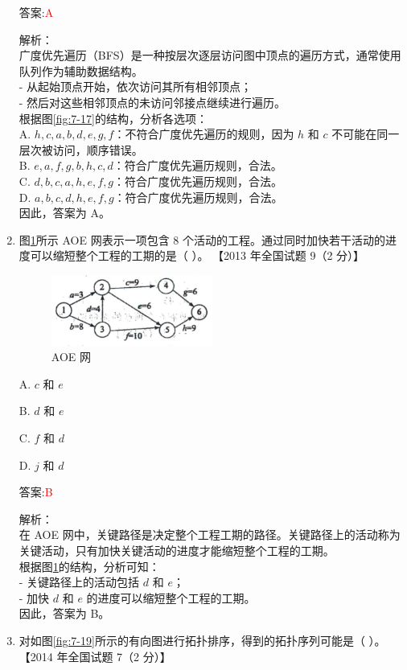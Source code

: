 \documentclass[lang=cn,newtx,10pt,scheme=chinese]{../../../elegantbook}
\begin{document}
\begin{enumerate}
        答案:\textcolor{red}{A}

        解析：\\
        广度优先遍历（BFS）是一种按层次逐层访问图中顶点的遍历方式，通常使用队列作为辅助数据结构。\\
        - 从起始顶点开始，依次访问其所有相邻顶点；\\
        - 然后对这些相邻顶点的未访问邻接点继续进行遍历。\\
        根据图\ref{fig:7-17}的结构，分析各选项：\\
        A. $h, c, a, b, d, e, g, f$：不符合广度优先遍历的规则，因为 $h$ 和 $c$ 不可能在同一层次被访问，顺序错误。\\
        B. $e, a, f, g, b, h, c, d$：符合广度优先遍历规则，合法。\\
        C. $d, b, c, a, h, e, f, g$：符合广度优先遍历规则，合法。\\
        D. $a, b, c, d, h, e, f, g$：符合广度优先遍历规则，合法。\\
        因此，答案为 A。
        \item 图\ref{fig:7-18}所示 AOE 网表示一项包含 8 个活动的工程。通过同时加快若干活动的进度可以缩短整个工程的工期的是（ ）。  
        【2013 年全国试题 9（2 分）】  

        \begin{figure}[h!]
            \centering
            \includegraphics[width=0.5\textwidth]{../../figure/exercisePicPDF/chapter7/7-18.pdf}
            \caption{AOE 网}
            \label{fig:7-18}
    \end{figure}

        A. $c$ 和 $e$  

        B. $d$ 和 $e$  

        C. $f$ 和 $d$  

        D. $j$ 和 $d$  
    
        答案:\textcolor{red}{B}

        解析：\\
        在 AOE 网中，关键路径是决定整个工程工期的路径。关键路径上的活动称为关键活动，只有加快关键活动的进度才能缩短整个工程的工期。\\
        根据图\ref{fig:7-18}的结构，分析可知：\\
        - 关键路径上的活动包括 $d$ 和 $e$；\\
        - 加快 $d$ 和 $e$ 的进度可以缩短整个工程的工期。\\
        因此，答案为 B。
        \item 对如图\ref{fig:7-19}所示的有向图进行拓扑排序，得到的拓扑序列可能是（ ）。  
        【2014 年全国试题 7（2 分）】  


\end{enumerate}
\end{document}

